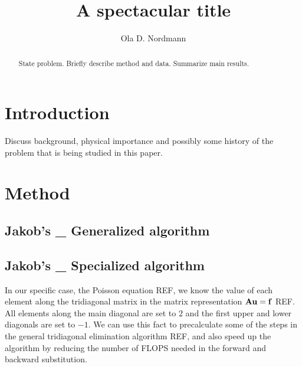 \documentclass{emulateapj}
\begin{document}
\title{A spectacular title}

\author{Ola D. Nordmann}





\begin{abstract}
  State problem. Briefly describe method and data. Summarize main results.
\end{abstract}

\section{Introduction}
\label{sec:introduction}

Discuss background, physical importance and possibly some history of
the problem that is being studied in this paper.




\section{Method}
\label{sec:method}

\subsection*{Jakob's \_ Generalized algorithm}

\subsection*{Jakob's \_ Specialized algorithm}
In our specific case, the Poisson equation REF, we know the value of each element along the tridiagonal matrix in the matrix representation $\vb{A}\vb{u} = \vb{f}$ REF. All elements along the main diagonal are set to $2$ and the first upper and lower diagonals are set to $-1$. We can use this fact to precalculate some of the steps in the general tridiagonal elimination algorithm REF, and also speed up the algorithm by reducing the number of FLOPS needed in the forward and backward substitution.
\end{document}
